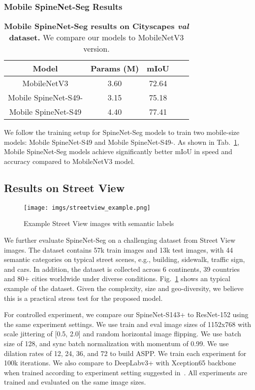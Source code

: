 \documentclass[10pt,twocolumn,letterpaper]{article}
\begin{document}
\subsubsection{Mobile SpineNet-Seg Results}
\setlength{\tabcolsep}{4pt}
\begin{table}[h!]
\centering
\begin{tabular}{c| c | c  c | c}
  \toprule
  Model & Params (M) & mIoU  \\
  \midrule
  MobileNetV3 \cite{mobilenetv3} & 3.60 & 72.64\\
  \midrule
  Mobile SpineNet-S49- & 3.15 & 75.18 \\
  Mobile SpineNet-S49 & 4.40 & 77.41 \\
  \bottomrule
\end{tabular}
\caption{\textbf{Mobile SpineNet-Seg results on Cityscapes \textit{val} dataset.} We compare our models to MobileNetV3 version.}
\label{tab:cityscapes_mobilenet} 
\end{table}
We follow the training setup for SpineNet-Seg models to train two mobile-size models: Mobile SpineNet-S49 and Mobile SpineNet-S49-. As shown in Tab.~\ref{tab:cityscapes_mobilenet}, Mobile SpineNet-Seg models achieve significantly better mIoU in speed and accuracy compared to MobileNetV3 model.


\subsection{Results on Street View}
\begin{figure}[h!]
    \centering
    \texttt{[image: imgs/streetview\_example.png]}
    \caption{Example Street View images with semantic labels}
    \label{fig:streetview_example}
\end{figure}


We further evaluate SpineNet-Seg on a challenging dataset from Street View images. The dataset contains 57k train images and 13k test images, with 44 semantic categories on typical street scenes, e.g., building, sidewalk, traffic sign, and cars. In addition, the dataset is collected across 6 continents, 39 countries and 80+ cities worldwide under diverse conditions. Fig.~\ref{fig:streetview_example} shows an typical example of the dataset. Given the complexity, size and geo-diversity, we believe this is a practical stress test for the proposed model.

For controlled experiment, we compare our SpineNet-S143+ to ResNet-152 using the same experiment settings. We use train and eval image sizes of 1152x768 with scale jittering of [0.5, 2.0] and random horizontal image flipping. We use batch size of 128, and sync batch normalization with momentum of 0.99. We use dilation rates of 12, 24, 36, and 72 to build ASPP. We train each experiment for 100k iterations. We also compare to DeepLabv3+ with Xception65 backbone when trained according to experiment setting suggested in~\cite{deeplabv3plus}. All experiments are trained and evaluated on the same image sizes.
\end{document}
